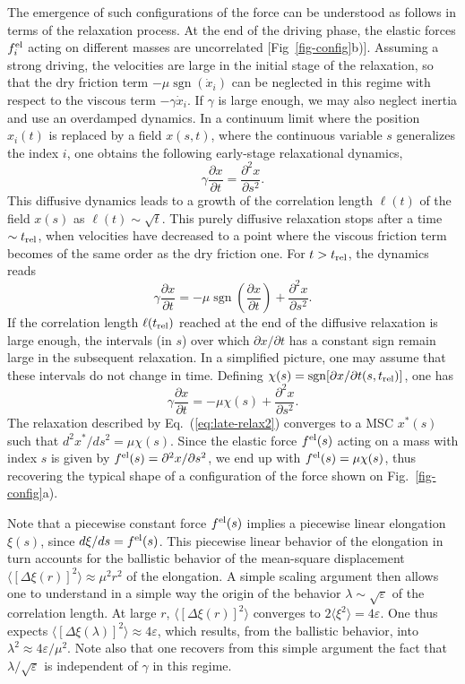 \documentclass[prl,twocolumn,floats,floatfix,aps,superscriptaddress,showpacs]{revtex4-1}
\newcommand{\be}{\begin{equation}}
\newcommand{\ee}{\end{equation}}
\newcommand{\ve}{\varepsilon}
\DeclareMathOperator{\sgn}{sgn}
\begin{document}
The emergence of such configurations of the force can be understood as follows in terms of the relaxation process.
At the end of the driving phase, the elastic forces $f_i^{\rm el}$ acting on different masses are uncorrelated [Fig~\ref{fig-config}b)]. Assuming a strong driving, the velocities are large in the initial stage of the relaxation, so that the dry friction term $-\mu \sgn(\dot{x}_i)$ can be neglected in this regime with respect to the viscous term
$-\gamma \dot{x}_i$. If $\gamma$ is large enough, we may also neglect inertia and use an overdamped dynamics.
In a continuum limit where the position $x_i(t)$ is replaced by a field
$x(s,t)$, where the continuous variable $s$ generalizes the index $i$, one obtains the following early-stage relaxational dynamics,
\be \label{eq:diffusive-relax}
\gamma \frac{\partial x}{\partial t} = \frac{\partial^2 x}{\partial s^2}.
\ee
This diffusive dynamics leads to a growth of the correlation length $\ell(t)$ of the field $x(s)$ as $\ell(t) \sim \sqrt{t}$.
This purely diffusive relaxation stops after a time $\sim t_{\rm rel}$, when velocities have decreased to a point where the viscous friction term becomes of the same order as the dry friction one.
For $t > t_{\rm rel}$, the dynamics reads
\be \label{eq:late-relax}
\gamma \frac{\partial x}{\partial t} = -\mu \sgn\left( \frac{\partial x}{\partial t} \right) + \frac{\partial^2 x}{\partial s^2}.
\ee
If the correlation length $\ell(t_{\rm rel})$ reached at the end of the diffusive relaxation is large enough, the intervals (in $s$) over which
$\partial x/\partial t$ has a constant sign remain large in the subsequent relaxation.
In a simplified picture, one may assume that these intervals do not change in time. Defining $\chi(s) = \sgn[\partial x/\partial t(s,t_{\rm rel})]$, one has
\be \label{eq:late-relax2}
\gamma \frac{\partial x}{\partial t} = -\mu \chi(s) + \frac{\partial^2 x}{\partial s^2}.
\ee
The relaxation described by Eq.~(\ref{eq:late-relax2}) converges to a MSC
$x^*(s)$ such that $d^2 x^*/ds^2=\mu \chi(s)$.
Since the elastic force $f^{\rm el}(s)$ acting on a mass with index $s$ is given
by $f^{\rm el}(s)=\partial^2 x/\partial s^2$, we end up with
$f^{\rm el}(s)=\mu \chi(s)$, thus recovering the typical shape of a configuration of the force shown on Fig.~\ref{fig-config}a).


Note that a piecewise constant force $f^{\rm el}(s)$ implies a piecewise linear elongation $\xi(s)$, since $d\xi/ds=f^{\rm el}(s)$. This piecewise linear behavior of the elongation in turn accounts for the ballistic behavior of the mean-square displacement $\langle[\Delta \xi(r)]^2\rangle \approx \mu^2 r^2$ of the elongation.
A simple scaling argument then allows one to understand in a simple way the origin of the behavior $\lambda \sim \sqrt{\ve}$ of the correlation length.
At large $r$, $\langle[\Delta \xi(r)]^2\rangle$ converges to
$2\langle \xi^2 \rangle = 4\ve$.
One thus expects $\langle[\Delta \xi(\lambda)]^2\rangle \approx 4\ve$,
which results, from the ballistic behavior, into $\lambda^2 \approx 4\ve/\mu^2$.
Note also that one recovers from this simple argument the fact that
$\lambda / \sqrt{\ve}$ is independent of $\gamma$ in this regime.
\end{document}
